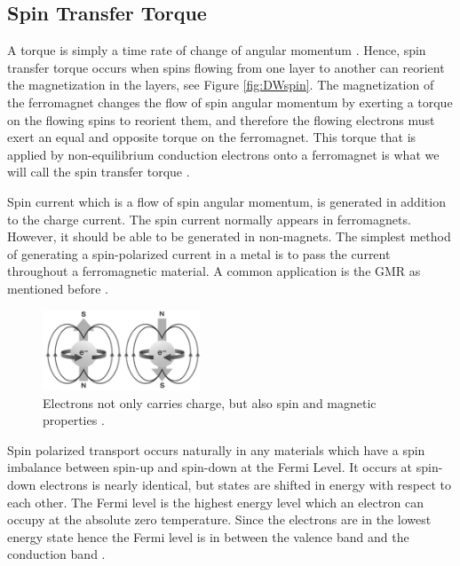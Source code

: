 \subsection{Spin Transfer Torque }

A torque is simply a time rate of change of angular momentum \cite{spintransfer}. Hence, spin transfer torque occurs when spins flowing from one layer to another can reorient the magnetization in the layers, see Figure \ref{fig:DWspin}. The magnetization of the ferromagnet changes the flow of spin angular momentum by exerting a torque on the flowing spins to reorient them, and therefore the flowing electrons must exert an equal and opposite torque on the ferromagnet. This torque that is applied by non-equilibrium conduction electrons onto a ferromagnet is what we will call the spin transfer torque \cite{spintransfer}.

Spin current which is a flow of spin angular momentum, is generated in addition to the charge current. The spin current normally appears in ferromagnets. However, it should be able to be generated in non-magnets. The simplest method of generating a spin-polarized current in a metal is to pass the current throughout a ferromagnetic material. A common application is the GMR as mentioned before \cite{handbookspin}.

\begin{figure}[htbp]
	\centering
		\includegraphics[width=0.42\textwidth]{Figures/electron.png}
		\smallskip
	\caption[Electron carries spin, charge and magnetic]{Electrons not only carries charge, but also spin and magnetic properties \cite{spinimg}. }
	\label{fig:electron}
\end{figure}


Spin polarized transport occurs naturally in any materials which have a spin imbalance between spin-up and spin-down at the Fermi Level. It occurs at spin-down electrons is nearly identical, but states are shifted in energy with respect to each other. The Fermi level is the highest energy level which an electron can occupy at the absolute zero temperature. Since the electrons are in the lowest energy state hence the Fermi level is in between the valence band and the conduction band \cite{handbookspin}.

